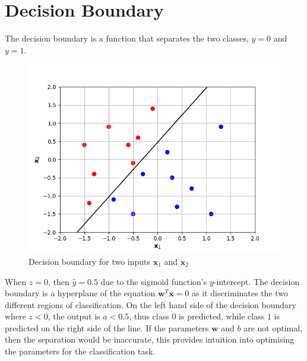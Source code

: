 \documentclass[12pt]{report}
\numberwithin{equation}{section}
\begin{document}
\section{Decision Boundary}
The decision boundary is a function that separates the two classes, $y=0$ and $y=1$.  
\begin{figure}[H]
\centering
\includegraphics[scale=0.8]{png/boundary.png} 
\caption{Decision boundary for two inputs $\bm{x}_1$ and $\bm{x}_2$}
\label{fig:boundary}
\end{figure} 
\noindent
When $z=0$, then $\hat{y}=0.5$ due to the sigmoid function's $y$-intercept. The decision boundary is a hyperplane of the equation $\bm{w}^T\bm{x}=0$ as it discriminates the two different regions of classification. On the left hand side of the decision boundary where $z<0$, the output is $a<0.5$, thus class $0$ is predicted, while class $1$ is predicted on the right side of the line.  If the parameters $\bm{w}$ and $b$ are not optimal, then the separation would be inaccurate, this provides intuition into  optimising  the parameters for the classification task.  



\end{document}
